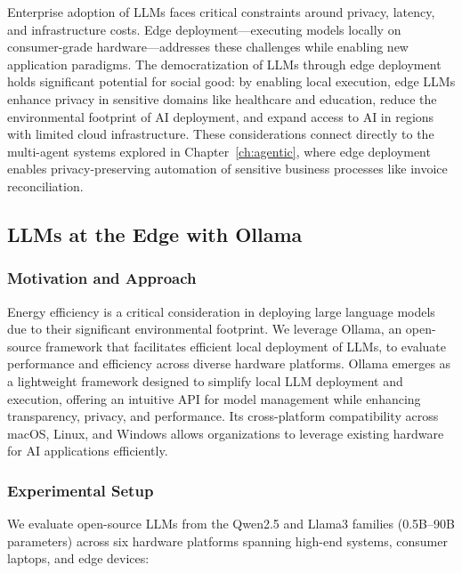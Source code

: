 Enterprise adoption of LLMs faces critical constraints around privacy, latency, and infrastructure costs. Edge deployment---executing models locally on consumer-grade hardware---addresses these challenges while enabling new application paradigms. The democratization of LLMs through edge deployment holds significant potential for social good: by enabling local execution, edge LLMs enhance privacy in sensitive domains like healthcare and education, reduce the environmental footprint of AI deployment, and expand access to AI in regions with limited cloud infrastructure. These considerations connect directly to the multi-agent systems explored in Chapter~\ref{ch:agentic}, where edge deployment enables privacy-preserving automation of sensitive business processes like invoice reconciliation.

\subsection{LLMs at the Edge with Ollama}
\label{subsec:ollama_edge}

\subsubsection{Motivation and Approach}

Energy efficiency is a critical consideration in deploying large language models due to their significant environmental footprint. We leverage Ollama, an open-source framework that facilitates efficient local deployment of LLMs, to evaluate performance and efficiency across diverse hardware platforms. Ollama emerges as a lightweight framework designed to simplify local LLM deployment and execution, offering an intuitive API for model management while enhancing transparency, privacy, and performance. Its cross-platform compatibility across macOS, Linux, and Windows allows organizations to leverage existing hardware for AI applications efficiently.

\subsubsection{Experimental Setup}

We evaluate open-source LLMs from the Qwen2.5 and Llama3 families (0.5B--90B parameters) across six hardware platforms spanning high-end systems, consumer laptops, and edge devices:

